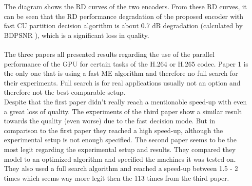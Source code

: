 The diagram shows the RD curves of the two encoders. From these RD curves, it can be seen that the RD performance degradation of the proposed
encoder with fast CU partition decision algorithm is about
0.7 dB degradation (calculated by BDPSNR \cite{bjontegaard}), which is a significant loss in quality.
\\
\\
The three papers all presented results regarding the use of the parallel performance of the GPU for certain tasks of the H.264 or H.265 codec.
Paper 1 is the only one that is using a fast ME algorithm and therefore no full search for their experiments. 
Full search is for real applications usually not an option and therefore not the best comparable setup.\\
Despite that the first paper didn't really reach a mentionable speed-up with even a great loss of quality. 
The experiments of the third paper show a similar result towards the quality (even worse) due to the fast decision mode. 
But in comparison to the first paper they reached a high speed-up, although the experimental setup is not enough specified. 
The second paper seems to be the most legit regarding the experimental setup and results. They compared they model to an optimized algorithm and specified the machines it was tested on. 
They also used  a full search algorithm and reached a speed-up between 1.5 - 2 times which seems way more legit then the 113 times from the third paper. 